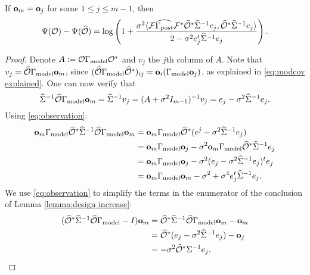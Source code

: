 \documentclass{amsart}
\numberwithin{equation}{section}
\begin{document}
\begin{corollary}\label{cor:same meas}
  If $\mathbf{o}_m = \mathbf{o}_j$ for some $1 \leq j \leq m-1$, then
  \begin{equation*}
    \Psi(\mathcal{O}) - \Psi(\widehat{\mathcal{O}}) =
    \log \left ( 1 + \frac{\sigma^2
      \langle \mathcal{F} \widehat{\Gamma_{\textup{post}}} \mathcal{F}^* \widehat{\mathcal{O}}^* \widehat{\Sigma}^{-1} e_j,
      \widehat{\mathcal{O}}^* \widehat{\Sigma}^{-1}e_j \rangle
    }{
      2 - \sigma^2 e_j^t\widehat{\Sigma}^{-1}e_j 
    }       
    \right ).
  \end{equation*}
\end{corollary}
\begin{proof}
  Denote $A:= \mathcal{O} \Gamma_{\textup{model}} \mathcal{O}^*$ and $v_j$ the $j$th column of $A$.
  Note that $v_j = \widehat{\mathcal{O}} \Gamma_{\textup{model}} \mathbf{o}_m$, since $(\widehat{\mathcal{O}} \Gamma_{\textup{model}}
  \widehat{\mathcal{O}}^*)_{ij} = \mathbf{o}_i(\Gamma_{\textup{model}} \mathbf{o}_j)$, as explained in
  \eqref{eq:modcov explained}. One can now verify that
  \begin{equation}\label{eq:observation}
    \widehat{\Sigma}^{-1} \widehat{\mathcal{O}} \Gamma_{\textup{model}} \mathbf{o}_m = \widehat{\Sigma}^{-1}v_j = (A +\sigma^2I_{m-1})^{-1} v_j =
    e_j -\sigma^2 \widehat{\Sigma}^{-1}e_j.
  \end{equation}
  Using \eqref{eq:observation}:
  \begin{align}\label{eq:denominator}
    \begin{split}
      \mathbf{o}_m \Gamma_{\textup{model}} \widehat{\mathcal{O}}^* \widehat{\Sigma}^{-1} \widehat{\mathcal{O}} \Gamma_{\textup{model}} \mathbf{o}_m
      &= \mathbf{o}_m \Gamma_{\textup{model}} \widehat{\mathcal{O}}^* ( e^j - \sigma^2 \widehat{\Sigma}^{-1} e_j )\\
      &= \mathbf{o}_m \Gamma_{\textup{model}} \mathbf{o}_j - \sigma^2 \mathbf{o}_m \Gamma_{\textup{model}} \widehat{\mathcal{O}}^* \widehat{\Sigma}^{-1}e_j \\
      &= \mathbf{o}_m \Gamma_{\textup{model}} \mathbf{o}_j -\sigma^2 (e_j - \sigma^2 \widehat{\Sigma}^{-1}e_j)^t e_j \\
      &= \mathbf{o}_m \Gamma_{\textup{model}} \mathbf{o}_m -\sigma^2 + \sigma^4 e_j^t\widehat{\Sigma}^{-1}e_j.
    \end{split}
  \end{align}
  We use \eqref{eq:observation} to simplify the terms in the enumerator of
  the conclusion of Lemma \ref{lemma:design increase}:
  \begin{align}\label{eq:enumerator}
    \begin{split}
      (\obsm^* \Sigmam^{-1} \obsm \modcov - I ) \meas_m
      &= \obsm^* \Sigmam^{-1} \obsm \modcov \meas_m - \meas_m \\
      &= \obsm^* (e_j - \sigma^2 \Sigmam^{-1} e_j) -\meas_j \\ 
      &= -\sigma^2 \obsm^* \Sigma^{-1}e_j. 

\end{split}
\end{align}
\end{proof}
\end{document}

